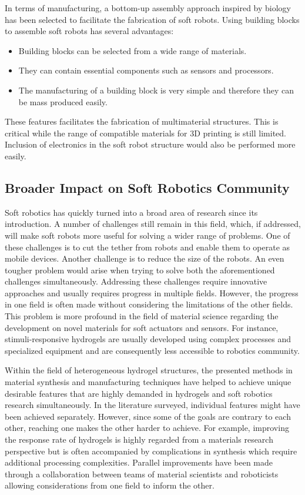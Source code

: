In terms of manufacturing, a bottom-up assembly approach inspired by biology has been selected to facilitate the fabrication of soft robots. Using building blocks to assemble soft robots has several advantages:
\begin{itemize}
	\item Building blocks can be selected from a wide range of materials. 
	\item They can contain essential components such as sensors and processors. 
	\item The manufacturing of a building block is very simple and therefore they can be mass produced easily. 
\end{itemize}

These features facilitates the fabrication of multimaterial structures. This is critical while the range of compatible materials for 3D printing is still limited.  Inclusion of electronics in the soft robot structure would also be performed more easily.  
\subsection{Broader Impact on Soft Robotics Community}
Soft robotics has quickly turned into a broad area of research since its introduction. A number of challenges still remain in this field, which, if addressed, will make soft robots more useful for solving a wider range of problems. One of these challenges is to cut the tether from robots and enable them to operate as mobile devices. Another challenge is to reduce the size of the robots. An even tougher problem would arise when trying to solve both the aforementioned challenges simultaneously. Addressing these challenges require innovative approaches and usually requires progress in multiple fields. However, the progress in one field is often made without considering the limitations of the other fields. This problem is more profound in the field of material science regarding the development on novel materials for soft actuators and sensors. For instance, stimuli-responsive hydrogels are usually developed using complex processes and specialized equipment and are consequently less accessible to robotics community. 

Within the field of heterogeneous hydrogel structures, the presented methods in material synthesis and manufacturing techniques have helped to achieve unique desirable features that are highly demanded in hydrogels and soft robotics research simultaneously. In the literature surveyed, individual features might have been achieved separately. However, since some of the goals are contrary to each other, reaching one makes the other harder to achieve. For example, improving the response rate of hydrogels is highly regarded from a materials research perspective but is often accompanied by complications in synthesis which require additional processing complexities. Parallel improvements have been made through a collaboration between teams of material scientists and roboticists allowing considerations from one field to inform the other.  

